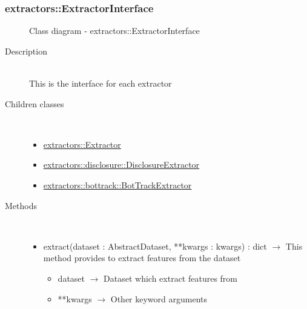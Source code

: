 \subsubsection[ExtractorInterface]{extractors::ExtractorInterface}
\begin{figure}[h]
\centering
{}
\caption{Class diagram - extractors::ExtractorInterface}
\end{figure}\begin{description}
\item[Description] \hfill \\
 This is the interface for each extractor
\item[Children classes] \hfill \\
 \vspace{-1cm}
\begin{itemize}
\item \hyperlink{extractors::Extractor}{extractors::Extractor}
\item \hyperlink{extractors::disclosure::DisclosureExtractor}{extractors::disclosure::DisclosureExtractor}
\item \hyperlink{extractors::bottrack::BotTrackExtractor}{extractors::bottrack::BotTrackExtractor}
\end{itemize}

\item[Methods] \hfill \\
 \vspace{-1cm}
\begin{itemize}
\item extract(dataset : AbstractDataset, **kwargs : kwargs) : dict $\rightarrow$ This method provides to extract features from the dataset\begin{itemize}
\item dataset $\rightarrow$ Dataset which extract features from
\item **kwargs $\rightarrow$ Other keyword arguments
\end{itemize}

\end{itemize}

\end{description}
\hypertarget{extractors::Extractor}{}
